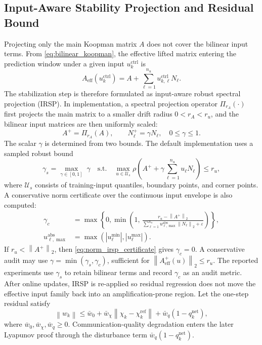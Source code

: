 \documentclass[letterpaper,journal]{IEEEtran}
\newcommand{\norm}[1]{\left\lVert #1 \right\rVert}
\begin{document}
\subsection{Input-Aware Stability Projection and Residual Bound}

Projecting only the main Koopman matrix $A$ does not cover the bilinear input terms. From \eqref{eq:bilinear_koopman}, the effective lifted matrix entering the prediction window under a given input $u_k^{\mathrm{ctrl}}$ is
\begin{equation}
A_{\mathrm{eff}}(u_k^{\mathrm{ctrl}})=A+\sum_{\ell=1}^{n_u}u_{k,\ell}^{\mathrm{ctrl}}N_\ell .
\label{eq:effective_bilinear_matrix}
\end{equation}
The stabilization step is therefore formulated as input-aware robust spectral projection (IRSP). In implementation, a spectral projection operator $\Pi_{r_A}(\cdot)$ first projects the main matrix to a smaller drift radius $0<r_A<r_u$, and the bilinear input matrices are then uniformly scaled:
\begin{equation}
A^+=\Pi_{r_A}(A),\qquad N_\ell^+=\gamma N_\ell,\quad 0\le\gamma\le 1 .
\label{eq:irsp_projection}
\end{equation}
The scalar $\gamma$ is determined from two bounds. The default implementation uses a sampled robust bound
\begin{equation}
\gamma_s=\max_{\gamma\in[0,1]}\;\gamma
\quad \mathrm{s.t.}\quad
\max_{u\in\mathcal U_s}
\rho\!\left(A^++\gamma\sum_{\ell=1}^{n_u}u_\ell N_\ell\right)
\le r_u ,
\label{eq:sampled_irsp}
\end{equation}
where $\mathcal U_s$ consists of training-input quantiles, boundary points, and corner points. A conservative norm certificate over the continuous input envelope is also computed:
\begin{equation}
\begin{aligned}
\gamma_c&=\max\left\{0,\min\left(1,\,
\frac{r_u-\norm{A^+}_2}{\sum_{\ell=1}^{n_u}u_{\ell,\max}^{\mathrm{abs}}\norm{N_\ell}_2+\varepsilon}
\right)\right\},\\
u_{\ell,\max}^{\mathrm{abs}}&=\max(|u_\ell^{\min}|,|u_\ell^{\max}|).
\end{aligned}
\label{eq:norm_irsp_certificate}
\end{equation}
If $r_u<\norm{A^+}_2$, then \eqref{eq:norm_irsp_certificate} gives $\gamma_c=0$. A conservative audit may use $\gamma=\min(\gamma_s,\gamma_c)$, sufficient for $\norm{A_{\mathrm{eff}}^+(u)}_2\le r_u$. The reported experiments use $\gamma_s$ to retain bilinear terms and record $\gamma_c$ as an audit metric. After online updates, IRSP is re-applied so residual regression does not move the effective input family back into an amplification-prone region. Let the one-step residual satisfy
\begin{equation}
\norm{w_k}\le \bar w_0+\bar w_\chi\norm{\chi_k-\chi_k^\mathrm{ref}}+\bar w_q(1-q_k^{\mathrm{net}}),
\label{eq:residual_bound}
\end{equation}
where $\bar w_0,\bar w_\chi,\bar w_q\ge0$. Communication-quality degradation enters the later Lyapunov proof through the disturbance term $\bar w_q(1-q_k^{\mathrm{net}})$.
\end{document}
